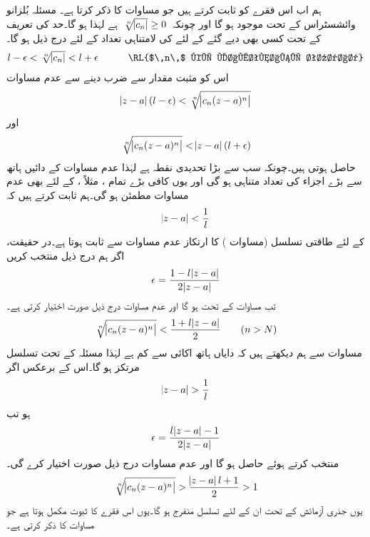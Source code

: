 ہم اب اس فقرے کو ثابت کرتے ہیں جو مساوات  کا ذکر کرتا ہے۔ مسئلہ بُلزانو وائشسٹراس  کے تحت  موجود ہو گا اور چونکہ
$\,\sqrt[\leftroot{-2}n]{\abs{c_n}}\ge 0\,$
ہے لہٰذا  ہو گا۔حد کی تعریف کے تحت کسی بھی دیے گئے  کے لئے  کی لامتناہی تعداد کے لئے درج ذیل ہو گا۔
\begin{align*}
l-\epsilon<\sqrt[\leftroot{-2}n]{\abs{c_n}}<l+\epsilon\quad \quad \quad \text{\RL{$\,n\,$ کی لامتناہی تعداد}}
\end{align*}
اس کو مثبت مقدار  سے ضرب دینے سے عدم مساوات
\begin{align}\label{مساوات_ٹیلر_رداس_ارتکاز_پ}
\abs{z-a}(l-\epsilon)<\sqrt[\leftroot{-2}n]{\abs{c_n(z-a)^n}}
\end{align}
اور
\begin{align}\label{مساوات_ٹیلر_رداس_ارتکاز_ت}
\sqrt[\leftroot{-2}n]{\abs{c_n(z-a)^n}}<\abs{z-a}(l+\epsilon)
\end{align}
حاصل ہوتی ہیں۔چونکہ  سب سے بڑا تحدیدی نقطہ ہے لہٰذا  عدم مساوات  کے دائیں ہاتھ سے بڑے اجزاء کی تعداد متناہی ہو گی اور یوں 
 کافی بڑے تمام ، مثلاً ، کے لئے بھی عدم مساوات  مطمئن ہو گی۔ہم ثابت کرتے ہیں کہ
\begin{align}\label{مساوات_ٹیلر_رداس_ارتکاز_ٹ}
\abs{z-a}<\frac{1}{l}
\end{align}
کے لئے طاقتی تسلسل (مساوات ) کا ارتکاز  عدم مساوات  سے ثابت ہوتا ہے۔در حقیقت، اگر ہم درج ذیل منتخب کریں
\begin{align*}
\epsilon=\frac{1-l\abs{z-a}}{2\abs{z-a}}
\end{align*}
تب مساوات  کے تحت  ہو گا اور عدم مساوات  درج ذیل صورت اختیار کرتی ہے۔
\begin{align*}
\sqrt[\leftroot{-2}n]{\abs{c_n(z-a)^n}}<\frac{1+l\abs{z-a}}{2}\quad \quad (n>N)
\end{align*}
مساوات  سے ہم دیکھتے ہیں کہ دایاں ہاتھ اکائی سے کم ہے لہٰذا مسئلہ  کے تحت تسلسل مرتکز ہو گا۔اس کے برعکس اگر 
\begin{align*}
\abs{z-a}>\frac{1}{l}
\end{align*}
ہو تب
\begin{align*}
\epsilon=\frac{l\abs{z-a}-1}{2\abs{z-a}}
\end{align*}
منتخب کرتے ہوئے  حاصل ہو گا اور  عدم مساوات  درج ذیل صورت اختیار کرے گی۔
\begin{align*}
\sqrt[\leftroot{-2}n]{\abs{c_n(z-a)^n}}>\frac{\abs{z-a}l+1}{2}>1
\end{align*}
یوں جذری آزمائش کے تحت ان  کے لئے تسلسل منفرج ہو گا۔یوں اس فقرے کا ثبوت مکمل ہوتا ہے  جو مساوات  کا ذکر کرتی ہے۔

